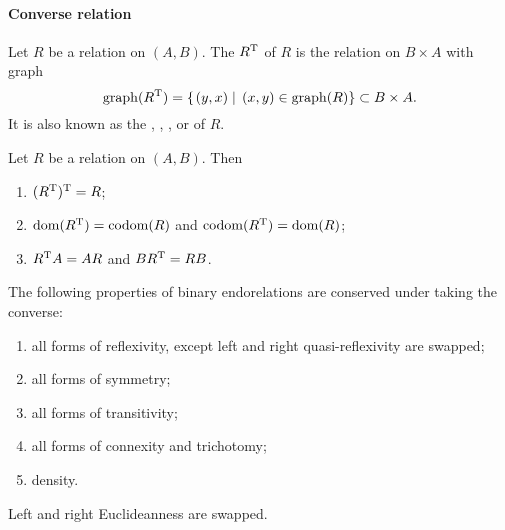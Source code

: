 \paragraph{Converse relation}
\begin{definition}
Let $R$ be a relation on $(A, B)$. The  $R^{\mathrm{T}}$ of $R$ is the relation on $B\times A$ with graph
\[ \operatorname{graph}(R^{\mathrm{T}}) = \left\{\left. (y,x) \;\right|\; (x,y)\in \operatorname{graph}(R) \right\} \subset B\times A. \]
It is also known as the , , ,  or  of $R$.
\end{definition}

\begin{lemma}
Let $R$ be a relation on $(A, B)$. Then
\begin{enumerate}
\item $(R^{\mathrm{T}})^{\mathrm{T}} = R$;
\item $\operatorname{dom}(R^{\mathrm{T}}) = \operatorname{codom}(R)$ and $\operatorname{codom}(R^{\mathrm{T}}) = \operatorname{dom}(R)$;
\item $R^{\mathrm{T}} A = AR$ and $BR^{\mathrm{T}} = RB$.
\end{enumerate}
\end{lemma}

\begin{lemma}
The following properties of binary endorelations are conserved under taking the converse:
\begin{enumerate}
\item all forms of reflexivity, except left and right quasi-reflexivity are swapped;
\item all forms of symmetry;
\item all forms of transitivity;
\item all forms of connexity and trichotomy;
\item density.
\end{enumerate}
Left and right Euclideanness are swapped.
\end{lemma}
